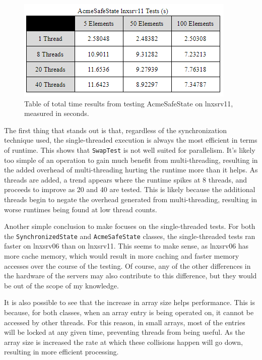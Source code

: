 \begin{figure}
  \includegraphics[scale=0.8]{acmesafe-11.png}
  \caption{\label{fig:vectors} Table of total time results from testing AcmeSafeState on lnxsrv11, measured in seconds. }
\end{figure}

\par The first thing that stands out is that, regardless of the synchronization
technique used, the single-threaded execution is always the most efficient in
terms of runtime. This shows that \texttt{SwapTest} is not well suited for
parallelism. It's likely too simple of an operation to gain much benefit from
multi-threading, resulting in the added overhead of multi-threading hurting the
runtime more than it helps. As threads are added, a trend appears where the runtime
spikes at 8 threads, and proceeds to improve as 20 and 40 are tested. This is likely
because the additional threads begin to negate the overhead generated from multi-threading,
resulting in worse runtimes being found at low thread counts. 
\par Another simple conclusion to make focuses on the single-threaded tests.
For both the \texttt{SynchronizedState} and \texttt{AcmeSafeState} classes,
the single-threaded tests ran faster on lnxsrv06 than on lnxsrv11. This seems
to make sense, as lnxsrv06 has more cache memory, which would result in more caching and faster
memory accesses over the course of the testing. Of course, any of the other
differences in the hardware of the servers may also contribute to this difference,
but they would be out of the scope of my knowledge.
\par It is also possible to see that the increase in array size helps performance. This is
because, for both classes, when an array entry is being operated on, it cannot be accessed
by other threads. For this reason, in small arrays, most of the entries will be locked
at any given time, preventing threads from being useful. As the array size is increased
the rate at which these collisions happen will go down, resulting in more efficient processing.

